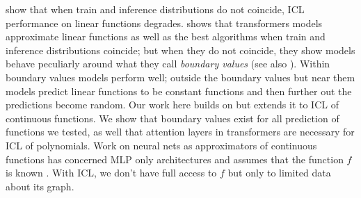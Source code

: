 \cite{xie2021explanation,zhang:etal:2024,giannou:etal:2024,naim:asher:2024a} show that when train and inference distributions do not coincide, ICL performance on linear functions degrades.  \cite{naim:asher:2024a} shows that transformers models approximate linear functions as well as the best algorithms when train and inference distributions coincide; but when they do not coincide, they show models behave peculiarly around what they call {\em boundary values} (see also \cite{giannou:etal:2024}).  Within boundary values models perform well; outside the boundary values but near them models predict linear functions to be constant functions and then further out the predictions become random.       %
 Our work here builds on \cite{naim:asher:2024b} but extends it to ICL of continuous functions. We show that boundary values exist for all prediction of functions we tested, as well that attention layers in transformers are necessary for ICL of polynomials. Work on neural nets as approximators of continuous functions has concerned MLP only architectures and assumes that the function $f$ is known \cite{hornik:etal:1989}. With ICL, we don't have full access to $f$ but only to limited data about its graph.     %
